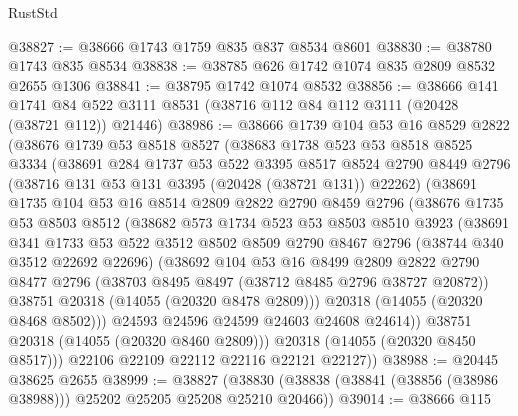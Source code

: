 \begin{lexlean}{RustStd}
\begin{coremodule}
@38827 := @38666 @1743 @1759 @835 @837 @8534 @8601
@38830 := @38780 @1743 @835 @8534
@38838 := @38785 @626 @1742 @1074 @835 @2809 @8532 @2655 @1306
@38841 := @38795 @1742 @1074 @8532
@38856 := @38666
    @141
    @1741
    @84
    @522
    @3111
    @8531
    (@38716 @112 @84 @112 @3111 (@20428 (@38721 @112)) @21446)
@38986 := @38666
    @1739
    @104
    @53
    @16
    @8529
    @2822
    (@38676
      @1739
      @53
      @8518
      @8527
      (@38683
        @1738
        @523
        @53
        @8518
        @8525
        @3334
        (@38691
          @284
          @1737
          @53
          @522
          @3395
          @8517
          @8524
          @2790
          @8449
          @2796
          (@38716 @131 @53 @131 @3395 (@20428 (@38721 @131)) @22262)
          (@38691
            @1735
            @104
            @53
            @16
            @8514
            @2809
            @2822
            @2790
            @8459
            @2796
            (@38676
              @1735
              @53
              @8503
              @8512
              (@38682
                @573
                @1734
                @523
                @53
                @8503
                @8510
                @3923
                (@38691
                  @341
                  @1733
                  @53
                  @522
                  @3512
                  @8502
                  @8509
                  @2790
                  @8467
                  @2796
                  (@38744 @340 @3512 @22692 @22696)
                  (@38692
                    @104
                    @53
                    @16
                    @8499
                    @2809
                    @2822
                    @2790
                    @8477
                    @2796
                    (@38703 @8495 @8497 (@38712 @8485 @2796 @38727 @20872))
                    @38751
                    @20318
                    (@14055 (@20320 @8478 @2809)))
                  @20318
                  (@14055 (@20320 @8468 @8502)))
                @24593
                @24596
                @24599
                @24603
                @24608
                @24614))
            @38751
            @20318
            (@14055 (@20320 @8460 @2809)))
          @20318
          (@14055 (@20320 @8450 @8517)))
        @22106
        @22109
        @22112
        @22116
        @22121
        @22127))
@38988 := @20445 @38625 @2655
@38999 := @38827
    (@38830 (@38838 (@38841 (@38856 (@38986 @38988))) @25202 @25205 @25208 @25210 @20466))
@39014 := @38666
    @115

\end{coremodule}
\end{lexlean}
